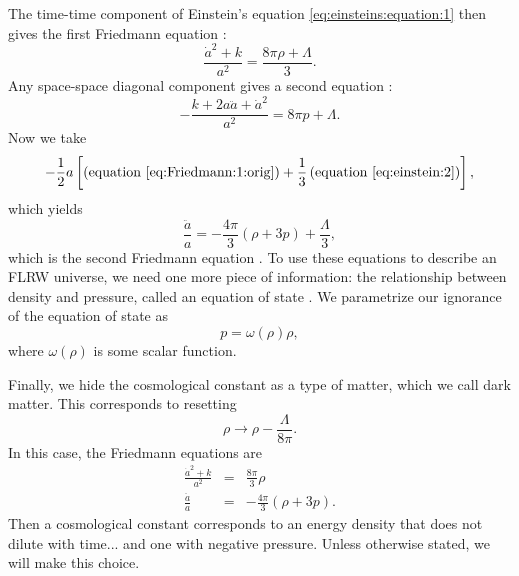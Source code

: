 \documentclass[]{article}
\begin{document}
The time-time component of Einstein's equation
\eqref{eq:einsteins:equation:1} then gives the first Friedmann equation \cite{Carroll,MisnerThorneWheeler,Kempf}:
\begin{equation}
  \label{eq:Friedmann:1:orig}
  \frac{\dot{a}^2 + k}{a^2} = \frac{8\pi \rho + \Lambda}{3}.
\end{equation} 
Any space-space diagonal component gives a second equation
\cite{Carroll,MisnerThorneWheeler,Kempf}:
\begin{equation}
  \label{eq:einstein:2}
  - \frac{k + 2a\ddot{a} + \dot{a}^2}{a^2} = 8\pi p + \Lambda.
\end{equation}
Now we take
\begin{equation}
  \label{eq:trace:condition}
  -\frac{1}{2} a \left[\left(\text{equation \eqref{eq:Friedmann:1:orig}}\right) + \frac{1}{3}\left(\text{equation \eqref{eq:einstein:2}}\right)\right],
\end{equation}
which yields
\begin{equation}
  \label{eq:Friedmann:2:orig}
  \frac{\ddot{a}}{a} = -\frac{4\pi}{3} \left(\rho + 3 p\right) + \frac{\Lambda}{3},
\end{equation}
which is the second Friedmann equation \cite{Kempf}. To use these
equations to describe an FLRW universe, we need one more piece of
information: the relationship between density and pressure, called an
equation of state \cite{Carroll,MisnerThorneWheeler,Kempf}. We
parametrize our ignorance of the equation of state as
\begin{equation}
  \label{eq:def:eos}
  p = \omega(\rho) \rho,
\end{equation}
where $\omega(\rho)$ is some scalar function. 

Finally, we hide the cosmological constant as a type of matter, which
we call dark matter. This corresponds to resetting
\begin{equation}
  \label{eq:rho:transformation}
  \rho\to\rho - \frac{\Lambda}{8\pi}.
\end{equation}
In this case, the Friedmann equations are
\begin{eqnarray}
  \label{eq:Friedmann:1}
  \frac{\dot{a}^2 + k}{a^2} &=& \frac{8\pi}{3}\rho\\
  \label{eq:Friedmann:2}
  \frac{\ddot{a}}{a} &=& -\frac{4\pi}{3} \left(\rho + 3 p\right).
\end{eqnarray}
Then a cosmological constant corresponds to an energy density that
does not dilute with time... and one with negative pressure. Unless
otherwise stated, we will make this choice.
\end{document}
